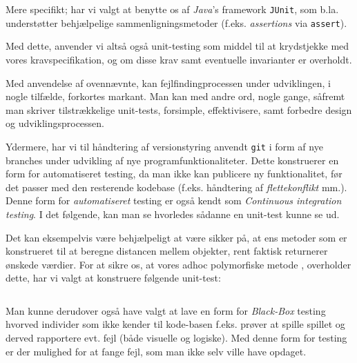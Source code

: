 \documentclass{article}
\newcommand{\code}[1]{\small\texttt{#1}}
\newcommand{\method}[1]{\textcolor{Orange}{\small\ttfamily\seqsplit{#1}}}
\newcommand{\snippet}[3]{\inputminted[firstline=#1,lastline=#2,linenos,
xleftmargin=1.5em, breaklines]{java}{#3}}
\theoremstyle{mytheoremstyle}
\theoremstyle{mytheoremstyle}
\theoremstyle{myproblemstyle}
\begin{document}
Mere specifikt; har vi valgt at benytte os af \textit{Java}'s framework
\texttt{JUnit}, som b.la. understøtter behjælpelige sammenligningsmetoder (f.eks.
\textit{assertions} via \code{assert}).

Med dette, anvender vi altså også unit-testing som middel til at krydstjekke med
vores kravspecifikation, og om disse krav samt eventuelle invarianter er
overholdt.

Med anvendelse af ovennævnte, kan fejlfindingprocessen under udviklingen, i
nogle tilfælde, forkortes markant. Man kan med andre ord, nogle gange, såfremt
man skriver tilstrækkelige unit-tests, forsimple, effektivisere, samt forbedre
design og udviklingsprocessen.

Ydermere, har vi til håndtering af versionstyring anvendt \code{git} i form af
nye branches under udvikling af nye programfunktionaliteter. Dette konstruerer
en form for automatiseret testing, da man ikke kan publicere ny funktionalitet,
før det passer med den resterende kodebase (f.eks. håndtering af
\textit{flettekonflikt} mm.). Denne form for \textit{automatiseret} testing er
også kendt som \textit{Continuous integration testing}. I det følgende, kan man
se hvorledes sådanne en unit-test kunne se ud.

Det kan eksempelvis være behjælpeligt at være sikker på, at ens metoder som er
konstrueret til at beregne distancen mellem objekter, rent faktisk returnerer
ønskede værdier. For at sikre os, at vores adhoc polymorfiske metode
\method{distanceBetween}, overholder dette, har vi valgt at konstruere følgende
unit-test:

\snippet{12}{55}{./code/AlgebraTest.java}

Man kunne derudover også have valgt at lave en form for \textit{Black-Box}
testing hvorved individer som ikke kender til kode-basen f.eks. prøver at spille
spillet og derved rapportere evt. fejl (både visuelle og logiske). Med denne
form for testing er der mulighed for at fange fejl, som man ikke selv ville have
opdaget.
\end{document}
